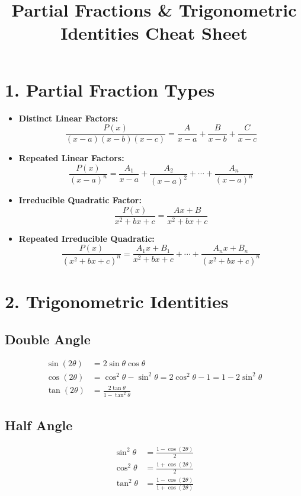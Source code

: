 \documentclass[11pt]{article}
\title{\textbf{Partial Fractions \& Trigonometric Identities Cheat Sheet}}
\date{}
\begin{document}
\maketitle

\section*{1. Partial Fraction Types}

\begin{itemize}
  \item \textbf{Distinct Linear Factors:}
  \[
    \frac{P(x)}{(x - a)(x - b)(x - c)} = \frac{A}{x - a} + \frac{B}{x - b} + \frac{C}{x - c}
  \]

  \item \textbf{Repeated Linear Factors:}
  \[
    \frac{P(x)}{(x - a)^n} = \frac{A_1}{x - a} + \frac{A_2}{(x - a)^2} + \cdots + \frac{A_n}{(x - a)^n}
  \]

  \item \textbf{Irreducible Quadratic Factor:}
  \[
    \frac{P(x)}{x^2 + bx + c} = \frac{Ax + B}{x^2 + bx + c}
  \]

  \item \textbf{Repeated Irreducible Quadratic:}
  \[
    \frac{P(x)}{(x^2 + bx + c)^n} = \frac{A_1x + B_1}{x^2 + bx + c} + \cdots + \frac{A_nx + B_n}{(x^2 + bx + c)^n}
  \]
\end{itemize}

\section*{2. Trigonometric Identities}

\subsection*{Double Angle}
\[
\begin{aligned}
\sin(2\theta) &= 2\sin\theta\cos\theta \\
\cos(2\theta) &= \cos^2\theta - \sin^2\theta = 2\cos^2\theta - 1 = 1 - 2\sin^2\theta \\
\tan(2\theta) &= \frac{2\tan\theta}{1 - \tan^2\theta}
\end{aligned}
\]

\subsection*{Half Angle}
\[
\begin{aligned}
\sin^2\theta &= \frac{1 - \cos(2\theta)}{2} \\
\cos^2\theta &= \frac{1 + \cos(2\theta)}{2} \\
\tan^2\theta &= \frac{1 - \cos(2\theta)}{1 + \cos(2\theta)}
\end{aligned}
\]
\end{document}
